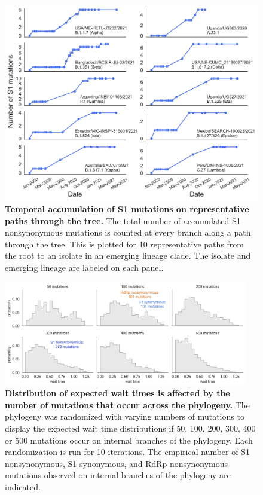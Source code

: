 \documentclass[11pt,oneside,letterpaper]{article}
\begin{document}
\begin{figure}[h!]
	\centerline{\includegraphics[scale=0.55]{fig3_supp_s1paths.png}}
	\caption{\textbf{Temporal accumulation of S1 mutations on representative paths through the tree.}
	The total number of accumulated S1 nonsynonymous mutations is counted at every branch along a path through the tree. This is plotted for 10 representative paths from the root to an isolate in an emerging lineage clade. The isolate and emerging lineage are labeled on each panel.
	}
	\label{fig:s1paths}
\end{figure}

\begin{figure}[h!]
	\centerline{\includegraphics[width=0.95\textwidth]{fig3_supp_expectedwait.png}}
	\caption{\textbf{Distribution of expected wait times is affected by the number of mutations that occur across the phylogeny.}
	The phylogeny was randomized with varying numbers of mutations to display the expected wait time distributions if 50, 100, 200, 300, 400 or 500 mutations occur on internal branches of the phylogeny. Each randomization is run for 10 iterations. The empirical number of S1 nonsynonymous, S1 synonymous, and RdRp nonsynonymous mutations observed on internal branches of the phylogeny are indicated.
	}
	\label{fig:expectedwait}
\end{figure}
\end{document}
